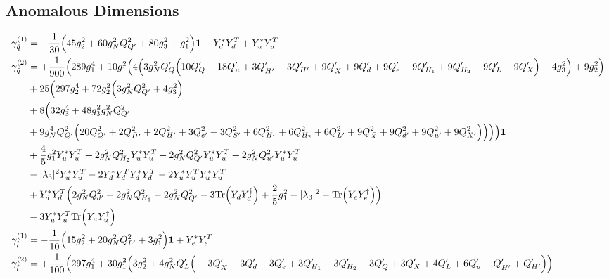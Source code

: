 \subsection{Anomalous Dimensions}
{\allowdisplaybreaks \begin{align} 
\gamma_{\hat{q}}^{(1)} & =  
-\frac{1}{30} \Big(45 g_{2}^{2}  + 60 g_{N}^{2} Q_{Q'}^{2}  + 80 g_{3}^{2}  + g_{1}^{2}\Big){\bf 1}  + {Y_d^*  Y_{d}^{T}} + {Y_u^*  Y_{u}^{T}}\\ 
\gamma_{\hat{q}}^{(2)} & =  
+\frac{1}{900} \Big(289 g_{1}^{4} +10 g_{1}^{2} \Big(4 \Big(3 g_{N}^{2} Q_Q' \Big(10 Q_Q'  -18 Q_u'  + 3 Q_{\bar{H}'}'  -3 Q_{H'}'  + 9 Q_{\bar{X}}'  + 9 Q_d'  + 9 Q_e'  -9 Q_{H_1}'  + 9 Q_{H_2}'  -9 Q_L'  -9 Q_X' \Big) + 4 g_{3}^{2} \Big) + 9 g_{2}^{2} \Big)\nonumber \\ 
 &+25 \Big(297 g_{2}^{4} +72 g_{2}^{2} \Big(3 g_{N}^{2} Q_{Q'}^{2}  + 4 g_{3}^{2} \Big)\nonumber \\ 
 &+8 \Big(32 g_{3}^{4} +48 g_{3}^{2} g_{N}^{2} Q_{Q'}^{2} \nonumber \\ 
 &+9 g_{N}^{4} Q_{Q'}^{2} \Big(20 Q_{Q'}^{2}  + 2 Q_{\bar{H}'}^{2}  + 2 Q_{H'}^{2}  + 3 Q_{e'}^{2}  + 3 Q_{S'}^{2}  + 6 Q_{H_1}^{2}  + 6 Q_{H_2}^{2}  + 6 Q_{L'}^{2}  + 9 Q_{\bar{X}}^{2}  + 9 Q_{d'}^{2}  + 9 Q_{u'}^{2}  + 9 Q_{X'}^{2} \Big)\Big)\Big)\Big){\bf 1} \nonumber \\ 
 &+\frac{4}{5} g_{1}^{2} {Y_u^*  Y_{u}^{T}} +2 g_{N}^{2} Q_{H_2}^{2} {Y_u^*  Y_{u}^{T}} -2 g_{N}^{2} Q_{Q'}^{2} {Y_u^*  Y_{u}^{T}} +2 g_{N}^{2} Q_{u'}^{2} {Y_u^*  Y_{u}^{T}} \nonumber \\ 
 &- |\lambda_3|^2 {Y_u^*  Y_{u}^{T}} -2 {Y_d^*  Y_{d}^{T}  Y_d^*  Y_{d}^{T}} -2 {Y_u^*  Y_{u}^{T}  Y_u^*  Y_{u}^{T}} \nonumber \\ 
 &+{Y_d^*  Y_{d}^{T}} \Big(2 g_{N}^{2} Q_{d'}^{2}  + 2 g_{N}^{2} Q_{H_1}^{2}  -2 g_{N}^{2} Q_{Q'}^{2}  -3 \mbox{Tr}\Big({Y_d  Y_{d}^{\dagger}}\Big)  + \frac{2}{5} g_{1}^{2}  - |\lambda_3|^2  - \mbox{Tr}\Big({Y_e  Y_{e}^{\dagger}}\Big) \Big)\nonumber \\ 
 &-3 {Y_u^*  Y_{u}^{T}} \mbox{Tr}\Big({Y_u  Y_{u}^{\dagger}}\Big) \\ 
\gamma_{\hat{l}}^{(1)} & =  
-\frac{1}{10} \Big(15 g_{2}^{2}  + 20 g_{N}^{2} Q_{L'}^{2}  + 3 g_{1}^{2} \Big){\bf 1}  + {Y_e^*  Y_{e}^{T}}\\ 
\gamma_{\hat{l}}^{(2)} & =  
+\frac{1}{100} \Big(297 g_{1}^{4} +30 g_{1}^{2} \Big(3 g_{2}^{2}  + 4 g_{N}^{2} Q_L' \Big(-3 Q_{\bar{X}}'  -3 Q_d'  -3 Q_e'  + 3 Q_{H_1}'  -3 Q_{H_2}'  -3 Q_Q'  + 3 Q_X'  + 4 Q_L'  + 6 Q_u'  - Q_{\bar{H}'}'  + Q_{H'}'\Big)\Big)\nonumber \\ 

\end{align}}
